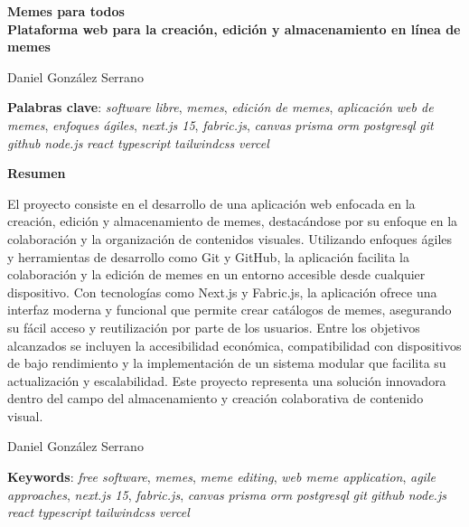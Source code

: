 \thispagestyle{empty}

\begin{center}
{\large\bfseries Memes para todos \\ Plataforma web para la creación, edición y almacenamiento en línea de memes }\\
\end{center}
\begin{center}
Daniel González Serrano\\
\end{center}


\vspace{0.5cm}
\noindent\textbf{Palabras clave}: \textit{software libre}, \textit{memes}, \textit{edición de memes}, \textit{aplicación web de memes}, \textit{enfoques ágiles}, \textit{next.js 15}, \textit{fabric.js}, \textit{canvas} \textit{prisma} \textit{orm} \textit{postgresql} \textit{git} \textit{github} \textit{node.js} \textit{react} \textit{typescript} \textit{tailwindcss} \textit{vercel}

\vspace{0.7cm}

\noindent\textbf{Resumen}

El proyecto consiste en el desarrollo de una aplicación web enfocada en la creación, edición y almacenamiento de memes, destacándose por su enfoque en la colaboración y la organización de contenidos visuales. Utilizando enfoques ágiles y herramientas de desarrollo como Git y GitHub, la aplicación facilita la colaboración y la edición de memes en un entorno accesible desde cualquier dispositivo. Con tecnologías como Next.js y Fabric.js, la aplicación ofrece una interfaz moderna y funcional que permite crear catálogos de memes, asegurando su fácil acceso y reutilización por parte de los usuarios. Entre los objetivos alcanzados se incluyen la accesibilidad económica, compatibilidad con dispositivos de bajo rendimiento y la implementación de un sistema modular que facilita su actualización y escalabilidad. Este proyecto representa una solución innovadora dentro del campo del almacenamiento y creación colaborativa de contenido visual.
	

\cleardoublepage

\begin{center}
	Daniel González Serrano\\
\end{center}
\vspace{0.5cm}
\noindent\textbf{Keywords}: \textit{free software}, \textit{memes}, \textit{meme editing}, \textit{web meme application}, \textit{agile approaches}, \textit{next.js 15}, \textit{fabric.js}, \textit{canvas} \textit{prisma} \textit{orm} \textit{postgresql} \textit{git} \textit{github} \textit{node.js} \textit{react} \textit{typescript} \textit{tailwindcss} \textit{vercel}
\vspace{0.7cm}

